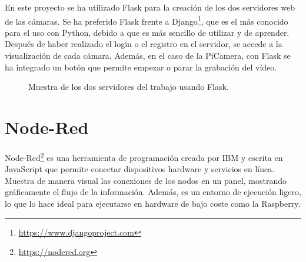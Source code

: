 En este proyecto se ha utilizado Flask para la creación de los dos servidores web de las cámaras. Se ha preferido Flask frente a Django\footnote{\url{https://www.djangoproject.com}}, que es el más conocido para el uso con Python, debido a que es más sencillo de utilizar y de aprender. Después de haber realizado el login o el registro en el servidor, se accede a la visualización de cada cámara. Además, en el caso de la PiCamera, con Flask se ha integrado un botón que permite empezar o parar la grabación del vídeo. \\
\begin{figure}[h!]
  \begin{center}
    \hspace{8mm}
  \end{center}
\caption{Muestra de los dos servidores del trabajo usando Flask.} \label{fig:servers}
\end{figure}

\section{Node-Red}
\label{sec:nodered}
Node-Red\footnote{\url{https://nodered.org}} es una herramienta de programación creada por IBM y escrita en JavaScript que permite conectar dispositivos hardware y servicios en línea. Muestra de manera visual las conexiones de los nodos en un panel, mostrando gráficamente el flujo de la información. Además, es un entorno de ejecución ligero, lo que lo hace ideal para ejecutarse en hardware de bajo coste como la Raspberry.\\

